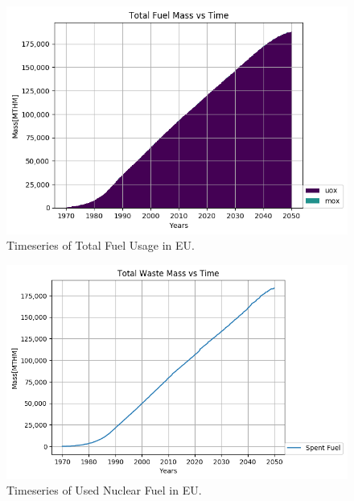 		\begin{figure}[htbp!]
			\begin{center}
				\includegraphics[width=\columnwidth]{./images/eu_future/total_fuel.png}
			\end{center}
			\caption{Timeseries of Total Fuel Usage in \gls{EU}.}
			\label{fig:eu_fuel}
		\end{figure}
		
		
		\begin{figure}[htbp!]
			\begin{center}
				\includegraphics[width=\columnwidth]{./images/eu_future/snf.png}
			\end{center}
			\caption{Timeseries of Used Nuclear Fuel in \gls{EU}.}
			\label{fig:eu_snf}
		\end{figure}
		\FloatBarrier
		
